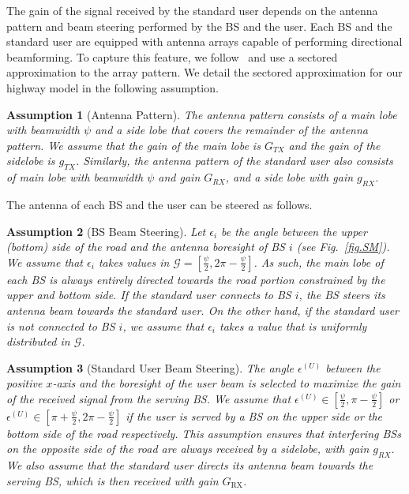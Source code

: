 \documentclass[10pt,journal,a4paper]{IEEEtran}
\newtheorem{assumption}{Assumption}[section]
\begin{document}
The gain of the signal received by the standard user depends on the antenna pattern and beam steering performed by the BS and the user. Each BS and the standard user are equipped with antenna arrays capable of performing directional beamforming. To capture this feature, we follow~\cite{6932503} and use a sectored approximation to the array pattern. We detail the sectored approximation for our highway model in the following assumption.

\begin{assumption}[Antenna Pattern]\label{ass.Pattern}
The antenna pattern consists of a main lobe with beamwidth $\psi$ and a side lobe that covers the remainder of the antenna pattern. We assume that the gain of the main lobe is $G_{TX}$ and the gain of the sidelobe is $g_{TX}$. Similarly, the antenna pattern of the standard user also consists of main lobe with beamwidth $\psi$ and gain $G_{RX}$, and a side lobe with gain $g_{RX}$.
\end{assumption}

The antenna of each BS and the user can be steered as follows.

\begin{assumption}[BS Beam Steering]\label{ass.BSst}
Let $\epsilon_i$ be the angle between the upper (bottom) side of the road and the antenna boresight of BS $i$ (see Fig.~\ref{fig.SM}). We assume that $\epsilon_i$ takes values in \mbox{$\mathcal{G} = [\frac{\psi}{2}, 2\pi-\frac{\psi}{2}]$}. As such, the main lobe of each BS is always entirely directed towards the road portion constrained by the upper and bottom side. If the standard user connects to BS $i$, the BS steers its antenna beam towards the standard user. On the other hand, if the standard user is not connected to BS $i$, we assume that $\epsilon_i$ takes a value that is uniformly distributed in $\mathcal{G}$.
\end{assumption}

\begin{assumption}[Standard User Beam Steering]\label{ass.antennaPattern}
The angle $\epsilon^{(U)}$ between the positive $x$-axis and the boresight of the user beam is selected to maximize the gain of the received signal from the serving BS. We assume that $\epsilon^{(U)} \in [\frac{\psi}{2},\pi - \frac{\psi}{2}]$ or $\epsilon^{(U)} \in [\pi + \frac{\psi}{2},2\pi - \frac{\psi}{2}]$ if the user is served by a BS on the upper side or the bottom side of the road respectively. This assumption ensures that interfering BSs on the opposite side of the road are always received by a sidelobe, with gain $g_{RX}$. We also assume that the standard user directs its antenna beam towards the serving BS, which is then received with gain $G_{\mathrm{RX}}$.
\end{assumption}
\end{document}

